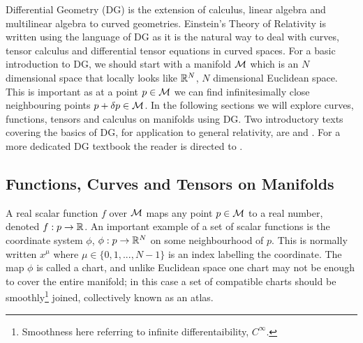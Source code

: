 Differential Geometry (DG) is the extension of calculus, linear algebra and multilinear algebra to curved
geometries. Einstein’s Theory of Relativity is written using the language of DG as it is the natural
way to deal with curves, tensor calculus and differential tensor equations in curved spaces. For a basic
introduction to DG, we should start with a manifold $\mathcal{M}$ which is an $N$ dimensional space that locally looks
like $\mathbb{R}^N$, $N$ dimensional Euclidean space. This is important as at a point $p\in\mathcal{M}$ we can find infinitesimally
close neighbouring points $p + \delta p \in \mathcal{M}$. In the following sections we will explore curves, functions, tensors and calculus on manifolds using DG.
Two introductory texts covering the basics of DG, for application to general relativity,
are \cite{carroll2019spacetime} and \cite{gourgoulhon20073+}. For a more dedicated
DG textbook the reader is directed to \cite{bar2010elementary}.

\subsection{Functions, Curves and Tensors on Manifolds}
A real scalar function $f$ over $\mathcal{M}$ maps any point $p\in \mathcal{M}$ to a real number, denoted
$f : p \rightarrow \mathbb{R}$. An important example of a set of scalar functions is the coordinate system $\phi$, $\phi : p \rightarrow \mathbb{R}^N$ on some neighbourhood of $p$. This is normally written $x^\mu$ where $\mu\in\{0,1,...,N-1\}$ is an index labelling the coordinate. The map $\phi$ is called a chart,
and unlike Euclidean space one chart may not be enough to cover the entire manifold; in this case a set
of compatible charts should be smoothly\footnote{Smoothness here referring to infinite differentaibility, $C^\infty$.} joined, collectively known as an atlas.


